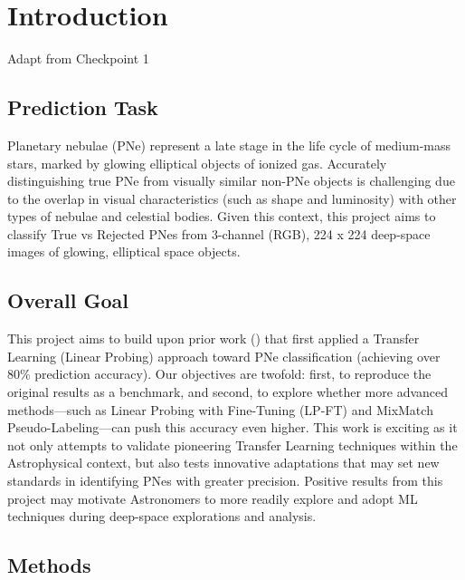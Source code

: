 \documentclass{article}
\begin{document}
\newpage

\section{Introduction}

{\color{red} Adapt from Checkpoint 1}

\subsection{Prediction Task}

Planetary nebulae (PNe) represent a late stage in the life cycle of medium-mass stars, marked by glowing elliptical objects of ionized gas. Accurately distinguishing true PNe from visually similar non-PNe objects is challenging due to the overlap in visual characteristics (such as shape and luminosity) with other types of nebulae and celestial bodies. Given this context, this project aims to classify True vs Rejected PNes from 3-channel (RGB), 224 x 224 deep-space images of glowing, elliptical space objects.

\subsection{Overall Goal}

This project aims to build upon prior work (\cite{awangiskandar2020}) that first applied a Transfer Learning (Linear Probing) approach toward PNe classification (achieving over 80\% prediction accuracy). Our objectives are twofold: first, to reproduce the original results as a benchmark, and second, to explore whether more advanced methods—such as Linear Probing with Fine-Tuning (LP-FT) and MixMatch Pseudo-Labeling—can push this accuracy even higher. This work is exciting as it not only attempts to validate pioneering Transfer Learning techniques within the Astrophysical context, but also tests innovative adaptations that may set new standards in identifying PNes with greater precision. Positive results from this project may motivate Astronomers to more readily explore and adopt ML techniques during deep-space explorations and analysis.

\subsection{Methods}
\end{document}
